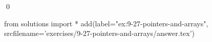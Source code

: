 
\begin{ex}
  \label{ex:9-27-pointers-and-arrays}
  
  \qed
\end{ex}
\begin{python0}
from solutions import *
add(label="ex:9-27-pointers-and-arrays",
    srcfilename='exercises/9-27-pointers-and-arrays/answer.tex')
\end{python0}
